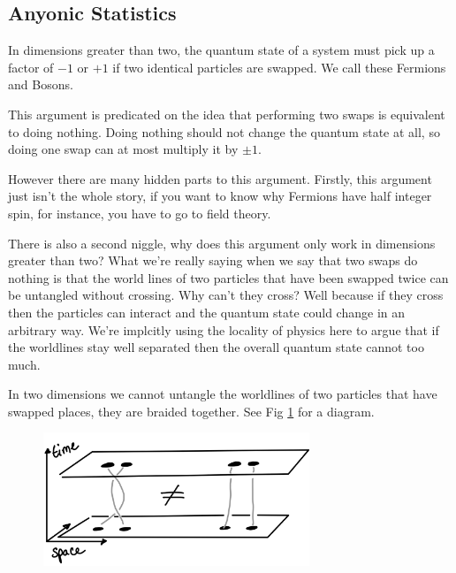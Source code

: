 \hypertarget{anyonic-statistics}{%
\subsection{Anyonic Statistics}\label{anyonic-statistics}}

In dimensions greater than two, the quantum state of a system must pick
up a factor of \(-1\) or \(+1\) if two identical particles are swapped.
We call these Fermions and Bosons.

This argument is predicated on the idea that performing two swaps is
equivalent to doing nothing. Doing nothing should not change the quantum
state at all, so doing one swap can at most multiply it by \(\pm 1\).

However there are many hidden parts to this argument. Firstly, this
argument just isn't the whole story, if you want to know why Fermions
have half integer spin, for instance, you have to go to field theory.

There is also a second niggle, why does this argument only work in
dimensions greater than two? What we're really saying when we say that
two swaps do nothing is that the world lines of two particles that have
been swapped twice can be untangled without crossing. Why can't they
cross? Well because if they cross then the particles can interact and
the quantum state could change in an arbitrary way. We're implcitly
using the locality of physics here to argue that if the worldlines stay
well separated then the overall quantum state cannot too much.

In two dimensions we cannot untangle the worldlines of two particles
that have swapped places, they are braided together. See Fig
\ref{fig:braiding} for a diagram.

\begin{figure}
\hypertarget{fig:braiding}{%
\centering
\includegraphics[width=0.71\textwidth,height=\textheight]{figure_code/amk_chapter/braiding.png}
\caption{}\label{fig:braiding}
}
\end{figure}


